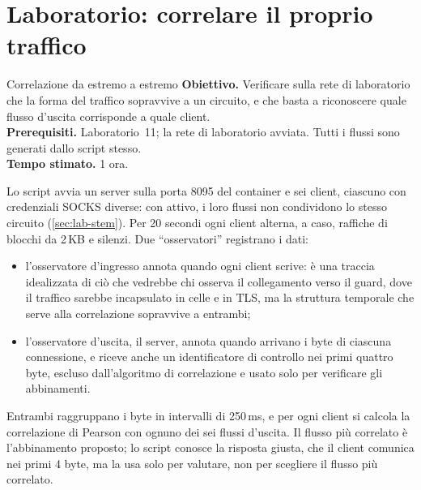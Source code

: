 \section{Laboratorio: correlare il proprio traffico}\label{sec:lab-attacchi}

\begin{laboratorio}[16]{Correlazione da estremo a estremo}
\textbf{Obiettivo.} Verificare sulla rete di laboratorio che la forma del traffico sopravvive a un circuito, e che basta a riconoscere quale flusso d'uscita corrisponde a quale client.\\
\textbf{Prerequisiti.} Laboratorio~11; la rete di laboratorio avviata. Tutti i flussi sono generati dallo script stesso.\\
\textbf{Tempo stimato.} 1 ora.
\end{laboratorio}

Lo script  avvia un server sulla porta 8095 del container e sei client, ciascuno con credenziali SOCKS diverse: con  attivo, i loro flussi non condividono lo stesso circuito (\cref{sec:lab-stem}). Per 20 secondi ogni client alterna, a caso, raffiche di blocchi da 2\,KB e silenzi. Due \enquote{osservatori} registrano i dati:
\begin{itemize}
  \item l'osservatore d'ingresso annota quando ogni client scrive: è una traccia idealizzata di ciò che vedrebbe chi osserva il collegamento verso il guard, dove il traffico sarebbe incapsulato in celle e in TLS, ma la struttura temporale che serve alla correlazione sopravvive a entrambi;
  \item l'osservatore d'uscita, il server, annota quando arrivano i byte di ciascuna connessione, e riceve anche un identificatore di controllo nei primi quattro byte, escluso dall'algoritmo di correlazione e usato solo per verificare gli abbinamenti.
\end{itemize}
Entrambi raggruppano i byte in intervalli di 250\,ms, e per ogni client si calcola la correlazione di Pearson con ognuno dei sei flussi d'uscita. Il flusso più correlato è l'abbinamento proposto; lo script conosce la risposta giusta, che il client comunica nei primi 4 byte, ma la usa solo per valutare, non per scegliere il flusso più correlato.

